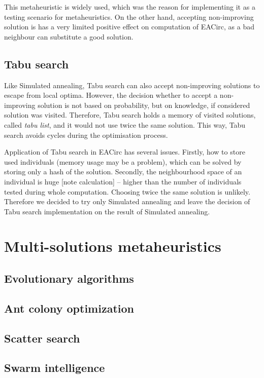 \documentclass[
  print, %
  Table,   %
  nolof,     %
  nolot,     %
  11pt, %
  oneside  %
]{fithesis3}
\begin{document}
This metaheuristic is widely used, which was the reason for implementing it as a testing scenario for metaheuristics. On the other hand, accepting non-improving solution is has a very limited positive effect on computation of EACirc, as a bad neighbour can substitute a good solution.

\subsection{Tabu search}
\label{subsec:opt-single-sol-tabu}

Like Simulated annealing, Tabu search can also accept non-improving solutions to escape from local optima. However, the decision whether to accept a non-improving solution is not based on probability, but on knowledge, if considered solution was visited. Therefore, Tabu search holds a memory of visited solutions, called \textit{tabu list}, and it would not use twice the same solution. This way, Tabu search avoids cycles during the optimisation process.

Application of Tabu search in EACirc has several issues. Firstly, how to store used individuals (memory usage may be a problem), which can be solved by storing only a hash of the solution. Secondly, the neighbourhood space of an individual is huge [note calculation] -- higher than the number of individuals tested during whole computation. Choosing twice the same solution is unlikely. Therefore we decided to try only Simulated annealing and leave the decision of Tabu search implementation on the result of Simulated annealing.

\section{Multi-solutions metaheuristics}
\label{sec:opt-multi-sol}
\subsection{Evolutionary algorithms}
\label{subsec:opt-multi-sol-ea}
\subsection{Ant colony optimization}
\label{subsec:opt-multi-sol-aco}
\subsection{Scatter search}
\label{subsec:opt-multi-sol-scatter}
\subsection{Swarm intelligence}
\label{subsec:opt-multi-sol-si}
\end{document}

